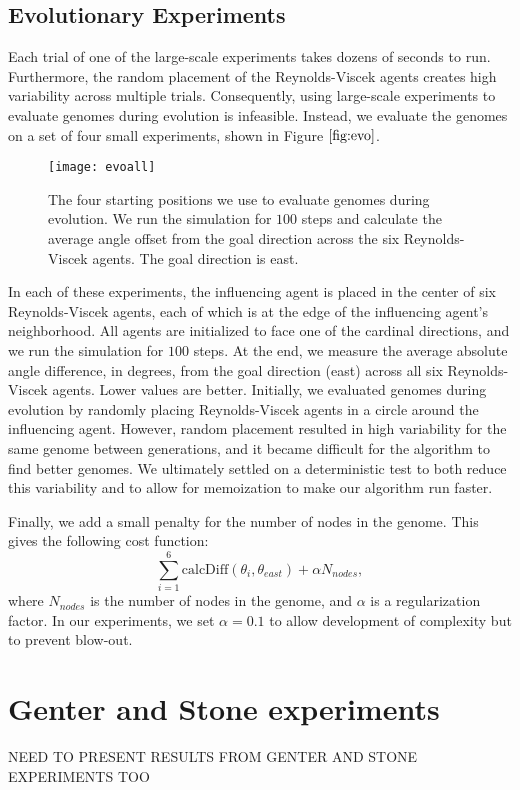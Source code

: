 \subsection{Evolutionary Experiments}
Each trial of one of the large-scale experiments takes dozens of seconds to run.
Furthermore, the random placement of the Reynolds-Viscek agents creates high
variability across multiple trials.
Consequently, using large-scale experiments to evaluate genomes during evolution
is infeasible.
Instead, we evaluate the genomes on a set of four small experiments, shown in
Figure $\ref{fig:evo}$.
\begin{figure}
    \centering
    \texttt{[image: evoall]}
    \caption{The four starting positions we use to evaluate genomes during
    evolution.
    We run the simulation for $100$ steps and calculate the average angle offset
    from the goal direction across the six Reynolds-Viscek agents.
    The goal direction is east.}
    \label{fig:evo}
\end{figure}
In each of these experiments, the influencing agent is placed in the center of
six Reynolds-Viscek agents, each of which is at the edge of the influencing
agent's neighborhood.
All agents are initialized to face one of the cardinal directions, and we run
the simulation for $100$ steps.
At the end, we measure the average absolute angle difference, in degrees, from
the goal direction (east) across all six Reynolds-Viscek agents.
Lower values are better.
Initially, we evaluated genomes during evolution by randomly placing
Reynolds-Viscek agents in a circle around the influencing agent.
However, random placement resulted in high variability for the same genome
between generations, and it became difficult for the algorithm to find better
genomes.
We ultimately settled on a deterministic test to both reduce this variability
and to allow for memoization to make our algorithm run faster.

Finally, we add a small penalty for the number of nodes in the genome.
This gives the following cost function:
\[ \sum_{i=1}^6 \text{calcDiff}(\theta_i, \theta_{east}) + \alpha N_{nodes}, \]
where $N_{nodes}$ is the number of nodes in the genome, and $\alpha$ is a
regularization factor.
In our experiments, we set $\alpha=0.1$ to allow development of complexity but
to prevent blow-out.

\section{Genter and Stone experiments}
NEED TO PRESENT RESULTS FROM GENTER AND STONE EXPERIMENTS TOO
